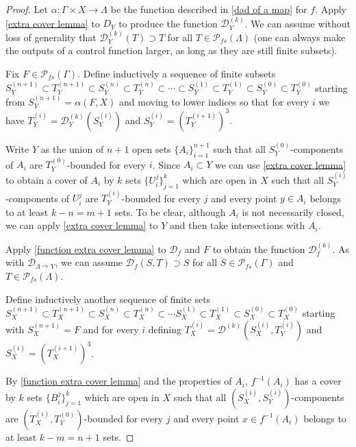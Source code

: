 \documentclass[12pt]{article}
\newcommand{\acts}{\curvearrowright}
\begin{document}
{\begin{proof}Let $\alpha: \Gamma\times X\to \Lambda$ be the function described in \ref{dad of a map} for $f$.  Apply \ref{extra cover lemma} to $D_{Y}$ to produce the function $\mathcal{D}^{(k)}_{Y}$.   We can assume without loss of generality that $\mathcal{D}^{(k)}_{Y}(T)\supset T$ for all $T\in \mathcal{P}_{fs}(\Lambda)$ (one can always make the outputs of a control function larger, as long as they are still finite subsets).  





Fix $F\in \mathcal{P}_{fs}(\Gamma)$.  Define inductively a sequence of finite subsets $S_Y^{(n+1)} \subset T_Y^{(n+1)}\subset S_Y^{(n)}\subset T_Y^{(n)}\subset \cdots \subset S_Y^{(1)}\subset T_Y^{(1)}\subset S_Y^{(0)}\subset T_Y^{(0)}$ starting from $S_Y^{(n+1)} = \alpha(F, X)$ and moving to lower indices so that for every $i$ we have $T_Y^{(i)} = \mathcal{D}^{(k)}_Y(S_Y^{(i)})$ and $S_Y^{(i)} = (T_Y^{(i+1)})^3$.  

Write $Y$ as the union of $n+1$ open sets $\{A_i\}_{i=1}^{n+1}$ such that all $S_Y^{(0)}$-components of $A_i$ are $T_Y^{(0)}$-bounded for every $i$.  Since $A_i\subset Y$ we can use \ref{extra cover lemma} to obtain a cover of $A_i$ by $k$ sets $\{U_i^j\}_{j=1}^k$ which are open in $X$ such that all $S_Y^{(i)}$-components of $U_i^j$ are $T_Y^{(i)}$-bounded for every $j$ and every point $y\in A_i$ belongs to at least $k-n = m+1$ sets.  To be clear, although $A_i$ is not necessarily closed, we can apply \ref{extra cover lemma} to $Y$ and then take intersections with $A_i$.  

Apply \ref{function extra cover lemma} to $\mathcal{D}_f$ and $F$ to obtain the function $\mathcal{D}^{(k)}_f$.     As with $\mathcal{D}_{\Lambda\acts Y}$, we can assume $\mathcal{D}_f(S, T)\supset S$ for all $S\in \mathcal{P}_{fs}(\Gamma)$ and $T\in \mathcal{P}_{fs}(\Lambda)$.  

Define inductively another sequence of finite sets $S_X^{(n+1)} \subset T_X^{(n+1)}\subset S_X^{(n)}\subset T_X^{(n)}\subset \cdots S_X^{(1)}\subset T_X^{(1)}\subset S_X^{(0)}\subset T_X^{(0)}$ starting with $S_X^{(n+1)} = F$ and for every $i$ defining $T_X^{(i)} = \mathcal{D}^{(k)}(S_X^{(i)}, T_Y^{(i)})$ and $S_X^{(i)} = (T_X^{(i+1)})^3$.  

By \ref{function extra cover lemma} and the properties of $A_i$, $f^{-1}(A_i)$ has a cover by $k$ sets $\{B_i^j\}_{j=1}^k$ which are open in $X$ such that all $(S_X^{(i)}, S_Y^{(i)})$-components are $(T_X^{(i)}, T_Y^{(0)})$-bounded for every $j$ and every point $x\in f^{-1}(A_i)$ belongs to at least $k-m = n + 1$ sets.  


\end{proof}}
\end{document}

